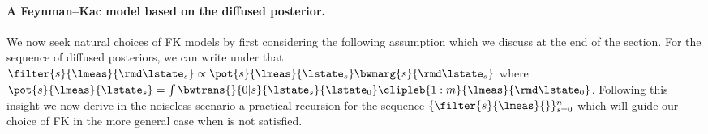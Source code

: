 \paragraph{A Feynman--Kac model based on the diffused posterior.}
We now seek natural choices of FK models by first considering the following assumption which we discuss at the end of the section.
For the sequence of diffused posteriors, we can write under 
\assp{\ref{assp:perfect}} that $\filter{s}{\lmeas}{\rmd \lstate_s} \propto  \pot{s}{\lmeas}{\lstate_s} \bwmarg{s}{\rmd \lstate_s}$ where $\pot{s}{\lmeas}{\lstate_s} = \int \bwtrans{}{0|s}{\lstate_s}{\lstate_0} \clipleb{1:m}{\lmeas}{\rmd \lstate_0}$. Following this insight we now derive in the noiseless scenario a practical recursion for the sequence $\{ \filter{s}{\lmeas}{} \}_{s = 0} ^n$ which will guide our choice of FK in the more general case when \assp{\ref{assp:perfect}} is not satisfied.

